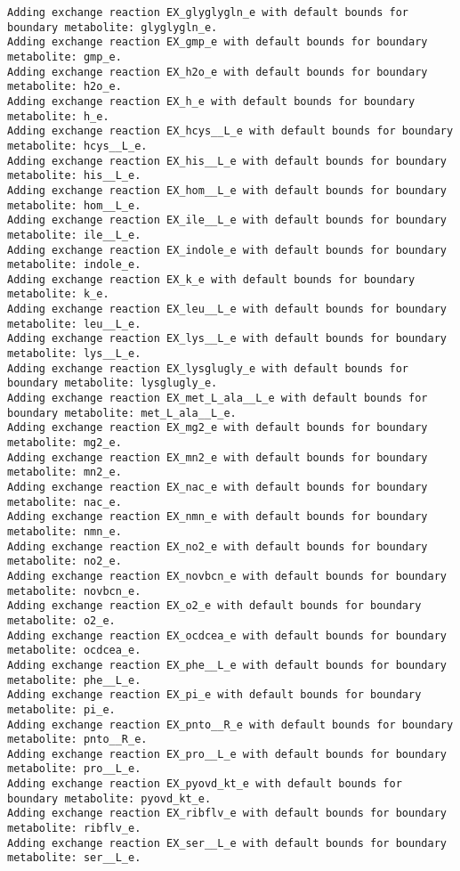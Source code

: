 \documentclass[
  letterpaper,
  DIV=11,
  numbers=noendperiod]{scrartcl}
\begin{document}
\begin{verbatim}
Adding exchange reaction EX_glyglygln_e with default bounds for boundary metabolite: glyglygln_e.
Adding exchange reaction EX_gmp_e with default bounds for boundary metabolite: gmp_e.
Adding exchange reaction EX_h2o_e with default bounds for boundary metabolite: h2o_e.
Adding exchange reaction EX_h_e with default bounds for boundary metabolite: h_e.
Adding exchange reaction EX_hcys__L_e with default bounds for boundary metabolite: hcys__L_e.
Adding exchange reaction EX_his__L_e with default bounds for boundary metabolite: his__L_e.
Adding exchange reaction EX_hom__L_e with default bounds for boundary metabolite: hom__L_e.
Adding exchange reaction EX_ile__L_e with default bounds for boundary metabolite: ile__L_e.
Adding exchange reaction EX_indole_e with default bounds for boundary metabolite: indole_e.
Adding exchange reaction EX_k_e with default bounds for boundary metabolite: k_e.
Adding exchange reaction EX_leu__L_e with default bounds for boundary metabolite: leu__L_e.
Adding exchange reaction EX_lys__L_e with default bounds for boundary metabolite: lys__L_e.
Adding exchange reaction EX_lysglugly_e with default bounds for boundary metabolite: lysglugly_e.
Adding exchange reaction EX_met_L_ala__L_e with default bounds for boundary metabolite: met_L_ala__L_e.
Adding exchange reaction EX_mg2_e with default bounds for boundary metabolite: mg2_e.
Adding exchange reaction EX_mn2_e with default bounds for boundary metabolite: mn2_e.
Adding exchange reaction EX_nac_e with default bounds for boundary metabolite: nac_e.
Adding exchange reaction EX_nmn_e with default bounds for boundary metabolite: nmn_e.
Adding exchange reaction EX_no2_e with default bounds for boundary metabolite: no2_e.
Adding exchange reaction EX_novbcn_e with default bounds for boundary metabolite: novbcn_e.
Adding exchange reaction EX_o2_e with default bounds for boundary metabolite: o2_e.
Adding exchange reaction EX_ocdcea_e with default bounds for boundary metabolite: ocdcea_e.
Adding exchange reaction EX_phe__L_e with default bounds for boundary metabolite: phe__L_e.
Adding exchange reaction EX_pi_e with default bounds for boundary metabolite: pi_e.
Adding exchange reaction EX_pnto__R_e with default bounds for boundary metabolite: pnto__R_e.
Adding exchange reaction EX_pro__L_e with default bounds for boundary metabolite: pro__L_e.
Adding exchange reaction EX_pyovd_kt_e with default bounds for boundary metabolite: pyovd_kt_e.
Adding exchange reaction EX_ribflv_e with default bounds for boundary metabolite: ribflv_e.
Adding exchange reaction EX_ser__L_e with default bounds for boundary metabolite: ser__L_e.

\end{verbatim}
\end{document}
